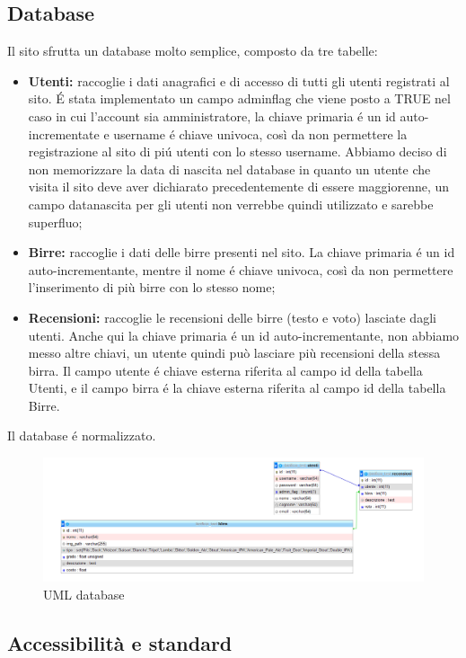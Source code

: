 \subsection{Database}
Il sito sfrutta un database molto semplice, composto da tre tabelle:
\begin{itemize}
\item \textbf{Utenti:} raccoglie i dati anagrafici e di accesso di tutti gli utenti registrati al sito. \'E stata implementato un campo admin\textunderscore flag che viene posto a TRUE nel caso in cui l'account sia amministratore, la chiave primaria é un id auto-incrementate e username é chiave univoca, così da non permettere la registrazione al sito di piú utenti con lo stesso username. Abbiamo deciso di non memorizzare la data di nascita nel database in quanto un utente che visita il sito deve aver dichiarato precedentemente di essere maggiorenne, un campo data\textunderscore nascita per gli utenti non verrebbe quindi utilizzato e sarebbe superfluo;
\item \textbf{Birre:} raccoglie i dati delle birre presenti nel sito. La chiave primaria é un id auto-incrementante, mentre il nome é chiave univoca, così da non permettere l'inserimento di più birre con lo stesso nome;
\item \textbf{Recensioni:} raccoglie le recensioni delle birre (testo e voto) lasciate dagli utenti. Anche qui la chiave primaria é un id auto-incrementante, non abbiamo messo altre chiavi, un utente quindi può lasciare più recensioni della stessa birra. Il campo utente é chiave esterna riferita al campo id della tabella Utenti, e il campo birra é la chiave esterna riferita al campo id della tabella Birre.
\end{itemize}
Il database é normalizzato.
\begin{figure}[H]
	\centering
	\includegraphics[width=16cm]{utility/db.png}
	\caption{UML database}
\end{figure}
\subsection{Accessibilità e standard}

